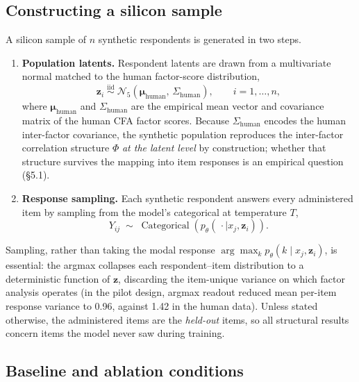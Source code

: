 \documentclass[11pt]{article}
\begin{document}
\subsection{Constructing a silicon sample}
\label{sec:silicon}

A silicon sample of $n$ synthetic respondents is generated in two steps.

\begin{enumerate}
\item \textbf{Population latents.} Respondent latents are drawn from a multivariate normal matched to the human factor-score distribution,
\begin{equation}
\mathbf{z}_i \;\overset{\text{iid}}{\sim}\; \mathcal{N}_5\!\left(\boldsymbol{\mu}_{\text{human}},\, \Sigma_{\text{human}}\right), \qquad i = 1, \dots, n,
\label{eq:latents}
\end{equation}
where $\boldsymbol{\mu}_{\text{human}}$ and $\Sigma_{\text{human}}$ are the empirical mean vector and covariance matrix of the human CFA factor scores. Because $\Sigma_{\text{human}}$ encodes the human inter-factor covariance, the synthetic population reproduces the inter-factor correlation structure $\Phi$ \textit{at the latent level} by construction; whether that structure survives the mapping into item responses is an empirical question (\S{}5.1).
\item \textbf{Response sampling.} Each synthetic respondent answers every administered item by sampling from the model's categorical at temperature $T$,
\begin{equation}
Y_{ij} \;\sim\; \operatorname{Categorical}\!\left(p_\theta(\,\cdot \mid x_j, \mathbf{z}_i)\right).
\label{eq:sampling}
\end{equation}
\end{enumerate}

Sampling, rather than taking the modal response $\arg\max_k p_\theta(k \mid x_j, \mathbf{z}_i)$, is essential: the argmax collapses each respondent--item distribution to a deterministic function of $\mathbf{z}$, discarding the item-unique variance on which factor analysis operates (in the pilot design, argmax readout reduced mean per-item response variance to 0.96, against 1.42 in the human data). Unless stated otherwise, the administered items are the \textit{held-out} items, so all structural results concern items the model never saw during training.

\subsection{Baseline and ablation conditions}
\label{sec:baselines}
\end{document}
